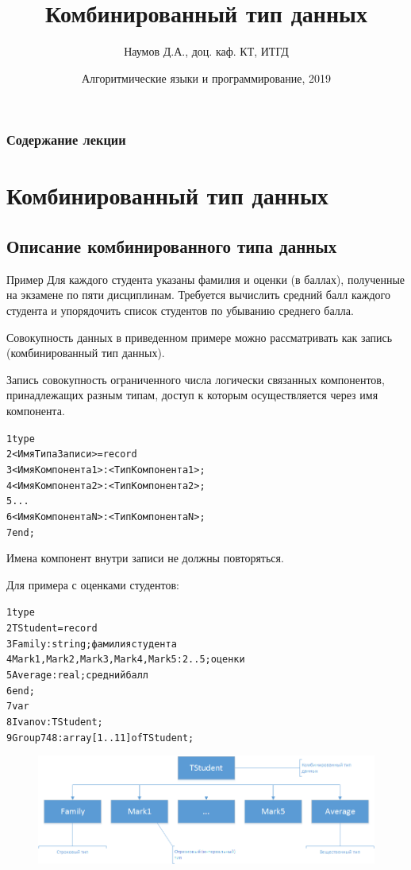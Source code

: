 \documentclass{beamer}
\title[Массивы]{Комбинированный тип данных}
\author{Наумов Д.А., доц. каф. КТ, ИТГД }
\date[12.03.2019] {Алгоритмические языки и программирование, 2019}
\begin{document}
\begin{frame}
  \titlepage
\end{frame}
  
\begin{frame}
  \frametitle{Содержание лекции}
  \tableofcontents  
\end{frame}
  
\section{Комбинированный тип данных}
\subsection{Описание комбинированного типа данных}
\begin{frame}
\begin{block}{Пример}
Для каждого студента указаны фамилия и оценки (в баллах), полученные на экзамене по пяти 
дисциплинам. Требуется вычислить средний балл каждого студента и упорядочить список студентов
по убыванию среднего балла.	
\end{block}
Совокупность данных в приведенном примере можно рассматривать как запись (комбинированный тип данных).
\end{frame} 

\begin{frame}[fragile]
\begin{block}{Запись}
совокупность ограниченного числа логически связанных компонентов, принадлежащих разным типам, доступ к которым
осуществляется через имя компонента.	
\end{block}
\begin{alltt}
1 type
2   <ИмяТипаЗаписи> = record
3      <ИмяКомпонента1>: <ТипКомпонента1>;
4      <ИмяКомпонента2>: <ТипКомпонента2>;
5      ... 
6      <ИмяКомпонентаN>: <ТипКомпонентаN>;
7   end;
\end{alltt}
Имена компонент внутри записи не должны повторяться.
\end{frame}

\begin{frame}[fragile]
Для примера с оценками студентов:
\begin{alltt}
1 type
2   TStudent = record
3      Family: string; 							{фамилия студента}
4      Mark1, Mark2, Mark3, Mark4, Mark5:2..5; 	{оценки}
5      Average: real; 							{средний балл}
6   end;
7   var
8     Ivanov: TStudent;
9     Group748: array[1..11] of TStudent; 
\end{alltt}
\begin{figure}
\centering
\includegraphics[scale=0.4]{images/record-01.png}
\end{figure}
\end{frame}
\end{document}
